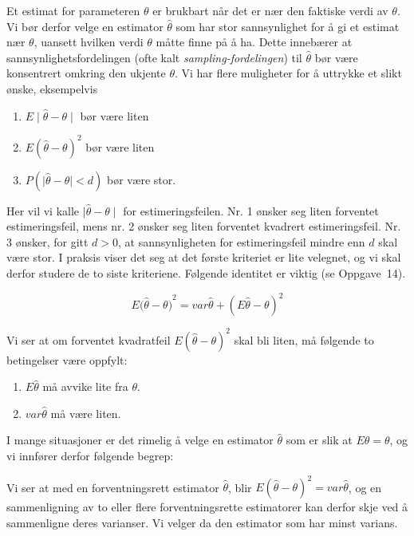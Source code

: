 \noindent Et estimat for parameteren $\theta$ er brukbart når det er
 nær den faktiske verdi av $\theta$. Vi bør derfor velge en estimator
$\hat{\theta}$ som har stor sannsynlighet for å gi et estimat nær
$\theta$, uansett hvilken verdi $\theta$ måtte finne på å ha.
Dette innebærer at sannsynlighetsfordelingen (ofte kalt {\em
sampling-fordelingen}) til $   \hat{\theta}   $ bør være konsentrert
omkring den ukjente $\theta$. Vi har flere muligheter for å
uttrykke et slikt ønske, eksempelvis
\begin{enumerate}
\item  $E\mid \hat{\theta} - \theta \mid$         bør være liten
\item  $E(\hat{\theta} - \theta )^2$             bør være liten
\item  $P(\mid \hat{\theta} - \theta \mid <d)$    bør være stor.
\end{enumerate}
Her vil vi kalle $\mid \hat{\theta} - \theta \mid$ for estimeringsfeilen.
Nr. 1 ønsker seg liten forventet estimeringsfeil, mens nr. 2
ønsker seg liten forventet kvadrert estimeringsfeil. Nr. 3
ønsker, for gitt $d>0$, at sannsynligheten for estimeringsfeil
mindre enn $d$ skal være stor. I praksis viser det seg at det
første kriteriet er lite velegnet, og vi skal derfor studere de
to siste kriteriene. Følgende identitet er viktig (se Oppgave~14).

\[E({\hat{\theta}-\theta )}^2=var\hat{\theta}+{(E\hat{\theta}-\theta )}^2 \]

\noindent Vi ser at om forventet kvadratfeil $E{(\hat{\theta}-\theta )}^2$ skal
bli liten, må følgende to betingelser være oppfylt:
\begin{enumerate}
\item $E \hat{\theta} $ må avvike lite fra $\theta$.
\item $var \hat{\theta} $ må være liten.
\end{enumerate}
I mange situasjoner er det rimelig å velge en estimator $ \hat{\theta} $
som er slik at $E\hat{\theta} = \theta$, og vi innfører derfor følgende
begrep:

\begin{center}  \end{center}
Vi ser at med en forventningsrett estimator $\hat{\theta}$, blir
 $E{(\hat{\theta}-\theta)}^2=var\hat{\theta} $, og en sammenligning av to
eller flere forventningsrette estimatorer kan derfor skje ved å sammenligne
deres varianser. Vi velger da den estimator som har minst varians.

